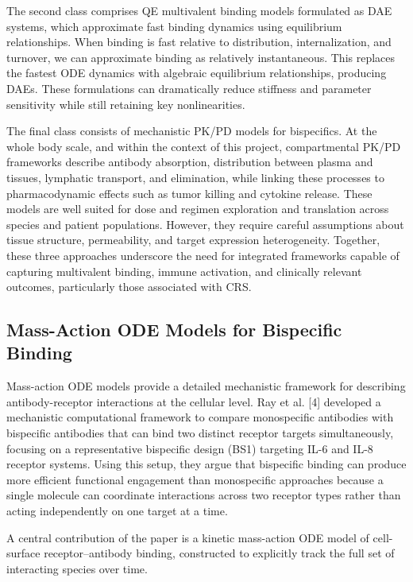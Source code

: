 \documentclass[11pt]{article}
\begin{document}
The second class comprises QE multivalent binding models formulated as DAE systems, which approximate fast binding dynamics using equilibrium relationships. When binding is fast relative to distribution, internalization, and turnover, we can approximate binding as relatively instantaneous. This replaces the fastest ODE dynamics with algebraic equilibrium relationships, producing DAEs. These formulations can dramatically reduce stiffness and parameter sensitivity while still retaining key nonlinearities.
\par\medskip

The final class consists of mechanistic PK/PD models for bispecifics. At the whole body scale, and within the context of this project, compartmental PK/PD frameworks describe antibody absorption, distribution between plasma and tissues, lymphatic transport, and elimination, while linking these processes to pharmacodynamic effects such as tumor killing and cytokine release. These models are well suited for dose and regimen exploration and translation across species and patient populations. However, they require careful assumptions about tissue structure, permeability, and target expression heterogeneity. Together, these three approaches underscore the need for integrated frameworks capable of capturing multivalent binding, immune activation, and clinically relevant outcomes, particularly those associated with CRS.
\par\medskip

\subsection{Mass-Action ODE Models for Bispecific Binding}

Mass-action ODE models provide a detailed mechanistic framework for describing antibody-receptor interactions at the cellular level. Ray et al. [4] developed a mechanistic computational framework to compare monospecific antibodies with bispecific antibodies that can bind two distinct receptor targets simultaneously, focusing on a representative bispecific design (BS1) targeting IL-6 and IL-8 receptor systems. Using this setup, they argue that bispecific binding can produce more efficient functional engagement than monospecific approaches because a single molecule can coordinate interactions across two receptor types rather than acting independently on one target at a time.
\par\medskip

A central contribution of the paper is a kinetic mass-action ODE model of cell-surface receptor–antibody binding, constructed to explicitly track the full set of interacting species over time.
\par\medskip
\end{document}
